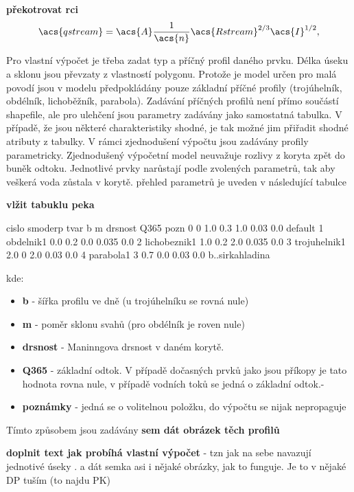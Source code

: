 \textbf{překotrovat rci}
\begin{equation}
    \acs{qstream} = \acs{A} \frac{1}{\acs{n}} \acs{Rstream}^{2/3} \acs{I}^{1/2}  ,
    \label{eq:qtok}
\end{equation}



Pro vlastní výpočet je třeba zadat typ a příčný profil daného prvku. Délka úseku a sklonu jsou převzaty z vlastností polygonu. Protože je model určen pro malá povodí jsou v modelu předpokládány pouze základní příčné profily (trojúhelník, obdélník, lichoběžník, parabola). 
Zadávání příčných profilů není přímo součástí shapefile, ale pro ulehčení jsou parametry zadávány jako samostatná tabulka. V případě, že jsou některé charakteristiky shodné, je tak možné jim přiřadit shodné atributy z tabulky.
V rámci zjednodušení výpočtu jsou zadávány profily parametricky. Zjednodušený výpočetní model neuvažuje rozlivy z koryta zpět do buněk odtoku. Jednotlivé prvky narůstají podle zvolených parametrů, tak aby veškerá voda zůstala v korytě.
přehled parametrů je uveden v následující tabulce

\textbf{vlžit tabuklu peka}

cislo	smoderp	tvar	b	m	drsnost	Q365	pozn
0	0	1.0	0.3	1.0	0.03	0.0	default
1	obdelnik1	0.0	0.2	0.0	0.035	0.0
2	lichobeznik1	1.0	0.2	2.0	0.035	0.0
3	trojuhelnik1	2.0	0	2.0	0.03	0.0
4	parabola1	3	0.7	0.0	0.03	0.0	b..sirkahladina




kde:
\begin{itemize}
\item \textbf{b} - šířka profilu ve dně (u trojúhelníku se rovná nule)
\item \textbf{m} - poměr sklonu svahů (pro obdélník je roven nule)
\item \textbf{drsnost} - Maninngova drsnost v daném korytě.
\item \textbf{Q365} - základní odtok. V případě dočasných prvků jako jsou příkopy je tato hodnota rovna nule, v případě vodních toků se jedná o základní odtok.-
\item \textbf{poznámky} - jedná se o volitelnou položku, do výpočtu se nijak nepropaguje
\end{itemize}

Tímto způsobem jsou zadávány
\textbf{sem dát obrázek těch profilů}


\textbf{doplnit text jak probíhá vlastní výpočet} - tzn jak na sebe navazují jednotivé úseky . a dát semka asi i nějaké  obrázky, jak to funguje. Je to v nějaké DP tuším (to najdu PK)


